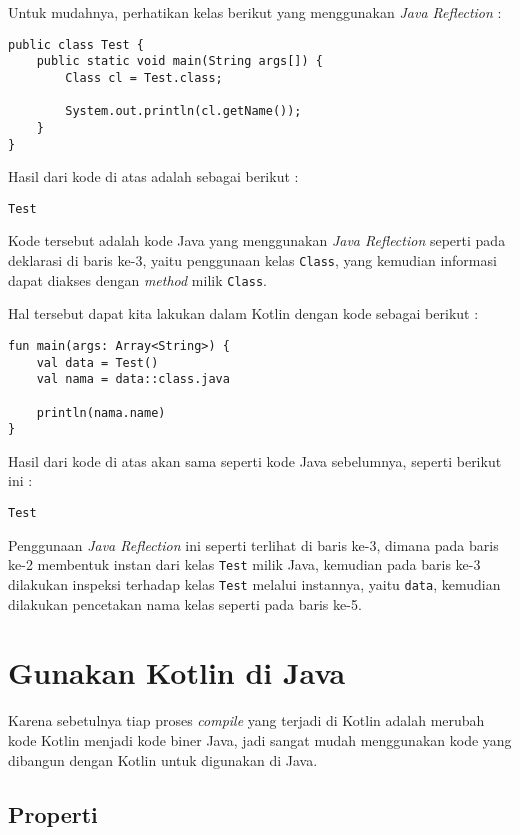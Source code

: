 Untuk mudahnya, perhatikan kelas berikut yang menggunakan \textit{Java Reflection} :

\begin{lstlisting}
public class Test {
	public static void main(String args[]) {
		Class cl = Test.class;
		
		System.out.println(cl.getName());
	}
}
\end{lstlisting}

Hasil dari kode di atas adalah sebagai berikut :

\begin{lstlisting}
Test
\end{lstlisting}

Kode tersebut adalah kode Java yang menggunakan \textit{Java Reflection} seperti pada deklarasi di baris ke-3, yaitu penggunaan kelas \texttt{Class}, yang kemudian informasi dapat diakses dengan \textit{method} milik \texttt{Class}.

Hal tersebut dapat kita lakukan dalam Kotlin dengan kode sebagai berikut :

\begin{lstlisting}
fun main(args: Array<String>) {
	val data = Test()
	val nama = data::class.java
	
	println(nama.name)
}
\end{lstlisting}

Hasil dari kode di atas akan sama seperti kode Java sebelumnya, seperti berikut ini :

\begin{lstlisting}
Test
\end{lstlisting}

Penggunaan \textit{Java Reflection} ini seperti terlihat di baris ke-3, dimana pada baris ke-2 membentuk instan dari kelas \texttt{Test} milik Java, kemudian pada baris ke-3 dilakukan inspeksi terhadap kelas \texttt{Test} melalui instannya, yaitu \texttt{data}, kemudian dilakukan pencetakan nama kelas seperti pada baris ke-5.

\section{Gunakan Kotlin di Java}

Karena sebetulnya tiap proses \textit{compile} yang terjadi di Kotlin adalah merubah kode Kotlin menjadi kode biner Java, jadi sangat mudah menggunakan kode yang dibangun dengan Kotlin untuk digunakan di Java.

\subsection{Properti}

